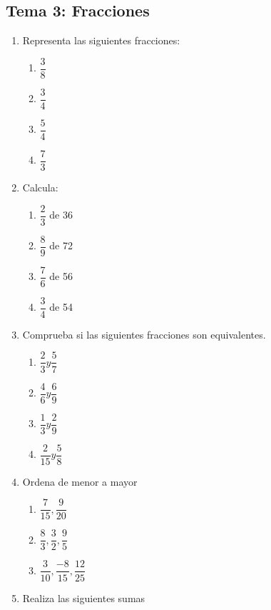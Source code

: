 \documentclass[a4paper,12pt]{article}
\begin{document}
\subsection*{Tema 3: Fracciones}
    \begin{enumerate}
        \item Representa las siguientes fracciones: 
            \begin{enumerate}
                \item $\dfrac{3}{8}$
                \item $\dfrac{3}{4}$
                \item $\dfrac{5}{4}$
                \item $\dfrac{7}{3}$
            \end{enumerate}        
        \item Calcula:
            \begin{enumerate}
                \item $\dfrac{2}{3}$ de 36
                \item $\dfrac{8}{9}$ de 72
                \item $\dfrac{7}{6}$ de 56
                \item $\dfrac{3}{4}$ de 54 
            \end{enumerate}
        \item Comprueba si las siguientes fracciones son equivalentes.
            \begin{enumerate}
                \item $\dfrac{2}{3} y \dfrac{5}{7}$
                \item $\dfrac{4}{6} y \dfrac{6}{9}$
                \item $\dfrac{1}{3} y \dfrac{2}{9}$
                \item $\dfrac{2}{15} y \dfrac{5}{8}$
            \end{enumerate}
        \item Ordena de menor a mayor
            \begin{enumerate}
                \item $\dfrac{7}{15} , \dfrac{9}{20}$
                \item $\dfrac{8}{3} , \dfrac{3}{2}, \dfrac{9}{5}$
                \item $\dfrac{3}{10}, \dfrac{-8}{15}, \dfrac{12}{25}$
            \end{enumerate}
        \item Realiza las siguientes sumas
            \begin{enumerate}

\end{enumerate}
\end{enumerate}
\end{document}

